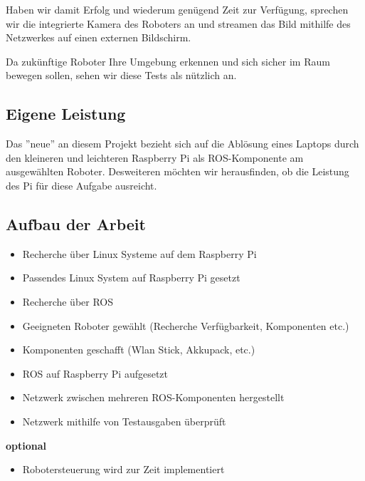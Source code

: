 \documentclass[12pt]{article}
\begin{document}
Haben wir damit Erfolg und wiederum genügend Zeit zur Verfügung, sprechen wir die integrierte Kamera des Roboters an und streamen das Bild mithilfe des Netzwerkes auf einen externen Bildschirm.

Da zukünftige Roboter Ihre Umgebung erkennen und sich sicher im Raum bewegen 
sollen, sehen wir diese Tests als nützlich an.


\subsection{Eigene Leistung}

Das ''neue'' an diesem Projekt bezieht sich
auf die Ablösung eines Laptops durch den kleineren und leichteren Raspberry Pi als ROS-Komponente am ausgewählten Roboter. Desweiteren möchten wir herausfinden, ob die Leistung des Pi für diese Aufgabe ausreicht.


\subsection{Aufbau der Arbeit}

\begin{itemize}

\item Recherche über Linux Systeme auf dem Raspberry Pi
\item Passendes Linux System auf Raspberry Pi gesetzt			
\item Recherche über ROS
\item Geeigneten Roboter gewählt (Recherche Verfügbarkeit, Komponenten etc.)
\item Komponenten geschafft (Wlan Stick, Akkupack, etc.)
\item ROS auf Raspberry Pi aufgesetzt
\item Netzwerk zwischen mehreren ROS-Komponenten hergestellt
\item Netzwerk mithilfe von Testausgaben überprüft \\

\end{itemize}

{\bf optional}

\begin{itemize}

\item Robotersteuerung wird zur Zeit implementiert



\end{itemize}
\end{document}

